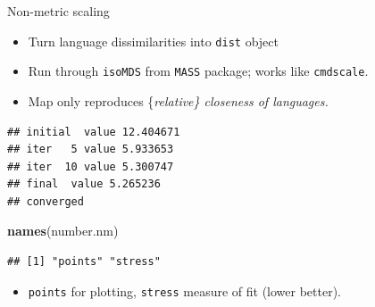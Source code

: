 \documentclass[ignorenonframetext,]{beamer}
\newenvironment{Shaded}{\begin{snugshade}}{\end{snugshade}}
\newcommand{\KeywordTok}[1]{\textcolor[rgb]{0.13,0.29,0.53}{\textbf{#1}}}
\newcommand{\NormalTok}[1]{#1}
\newcommand{\OperatorTok}[1]{\textcolor[rgb]{0.81,0.36,0.00}{\textbf{#1}}}
\newcommand{\StringTok}[1]{\textcolor[rgb]{0.31,0.60,0.02}{#1}}
\providecommand{\tightlist}{%
  \setlength{\itemsep}{0pt}\setlength{\parskip}{0pt}}
\begin{document}
\begin{frame}[fragile]{Non-metric scaling}
\protect\hypertarget{non-metric-scaling-1}{}

\begin{itemize}
\item
  Turn language dissimilarities into \texttt{dist} object
\item
  Run through \texttt{isoMDS} from \texttt{MASS} package; works like
  \texttt{cmdscale}.
\item
  Map only reproduces \{\em relative\} closeness of languages.
\end{itemize}

\begin{Shaded}
\end{Shaded}

\begin{verbatim}
## initial  value 12.404671 
## iter   5 value 5.933653
## iter  10 value 5.300747
## final  value 5.265236 
## converged
\end{verbatim}

\begin{Shaded}
\begin{Highlighting}[]
\KeywordTok{names}\NormalTok{(number.nm)}
\end{Highlighting}
\end{Shaded}

\begin{verbatim}
## [1] "points" "stress"
\end{verbatim}

\begin{itemize}
\tightlist
\item
  \texttt{points} for plotting, \texttt{stress} measure of fit (lower
  better).
\end{itemize}

\end{frame}
\end{document}
